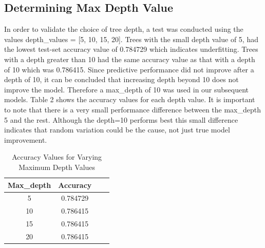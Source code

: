 \documentclass{article}
\theoremstyle{plain}
\theoremstyle{definition}
\theoremstyle{remark}
\begin{document}
\subsection{Determining Max Depth Value}
In order to validate the choice of tree depth, a test was conducted using the values depth\_values = [5, 10, 15, 20]. Trees with the small depth value of 5, had the lowest test-set accuracy value of 0.784729 which indicates underfitting. Trees with a depth greater than 10 had the same accuracy value as that with a depth of 10 which was 0.786415. Since predictive performance did not improve after a depth of 10, it can be concluded that increasing depth beyond 10 does not improve the model. Therefore a max\_depth of 10 was used in our subsequent models. Table 2 shows the accuracy values for each depth value. It is important to note that there is a very small performance difference between the max\_depth 5 and the rest. Although the depth=10 performs best this small difference indicates that random variation could be the cause, not just true model improvement. 
\begin{table}
    \centering
    \begin{tabular}{cccl}\toprule
         Max\_depth& Accuracy\\\midrule
         5&  0.784729\\
         10&  0.786415\\ 
         15&  0.786415\\ 
         20&  0.786415\\\bottomrule
    \end{tabular}
    \caption{Accuracy Values for Varying Maximum Depth Values}
    \label{tab:placeholder}
\end{table}
\end{document}
